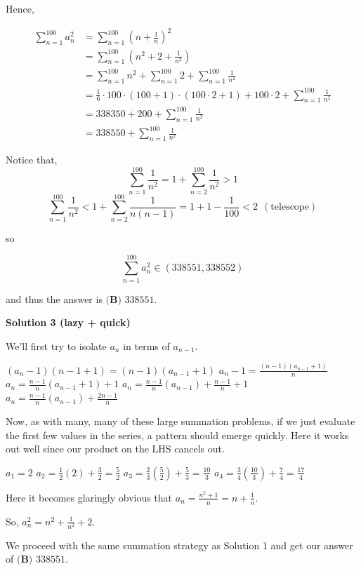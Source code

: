 \begin{enumerate}
 Hence,

 
 \begin{align*} \sum_{n = 1}^{100} a_n^2 &= \sum_{n = 1}^{100} \left(n + \frac{1}{n}\right)^2\\ &= \sum_{n = 1}^{100} (n^2 + 2 + \frac{1}{n^2})\\ &= \sum_{n = 1}^{100} n^2 + \sum_{n = 1}^{100} 2 + \sum_{n = 1}^{100}\frac{1}{n^2}\\ &= \frac{1}{6} \cdot 100 \cdot (100 + 1) \cdot (100 \cdot 2 + 1) + 100 \cdot 2 + \sum_{n = 1}^{100}\frac{1}{n^2}\\ &= 338350 + 200 + \sum_{n = 1}^{100}\frac{1}{n^2}\\ &= 338550 + \sum_{n = 1}^{100}\frac{1}{n^2} \end{align*}


 Notice that, 
 \[\sum_{n = 1}^{100}\frac{1}{n^2} = 1 + \sum_{n = 2}^{100}\frac{1}{n^2} > 1\]
 \[\sum_{n = 1}^{100}\frac{1}{n^2} < 1 + \sum_{n = 2}^{100}\frac{1}{n(n - 1)} = 1 + 1 - \frac{1}{100} < 2~~(\text{telescope})\]

 so

 
 \[\sum^{100}_{n=1} a_n^2\in(338551,338552)\]

 and thus the answer is $\boxed{\textbf{(B) }338551}$.

 



\textbf{Solution 3 (lazy + quick)}

We'll first try to isolate $a_n$ in terms of $a_{n-1}$.

 $(a_n-1)(n-1+1)=(n-1)(a_{n-1}+1)$
$a_n-1=\frac{(n-1)(a_{n-1}+1)}{n}$
$a_n=\frac{n-1}{n}(a_{n-1}+1)+1$
$a_n=\frac{n-1}{n}(a_{n-1})+\frac{n-1}{n}+1$
$a_n=\frac{n-1}{n}(a_{n-1})+\frac{2n-1}{n}$

 Now, as with many, many of these large summation problems, if we just evaluate the first few values in the series, a pattern should emerge quickly. Here it works out well since our product on the LHS cancels out.

 $a_1=2$
$a_2=\frac{1}{2}(2)+\frac{3}{2}=\frac{5}{2}$
$a_3=\frac{2}{3}(\frac{5}{2})+\frac{5}{3}=\frac{10}{3}$
$a_4=\frac{3}{4}(\frac{10}{3})+\frac{7}{4}=\frac{17}{4}$

 Here it becomes glaringly obvious that $a_n=\frac{n^2+1}{n}=n+\frac{1}{n}$. 

 So, $a_n^2=n^2+\frac{1}{n^2}+2$.

 We proceed with the same summation strategy as Solution 1 and get our answer of $\boxed{\textbf{(B) }338551}$.


\end{enumerate}
